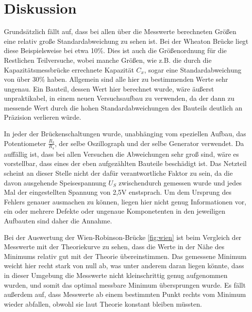\section{Diskussion}
\label{sec:Diskussion}

Grundsätzlich fällt auf, dass bei allen über die Messwerte berechneten Größen
eine relativ große Standardabweichung zu sehen ist. Bei der Wheaton Brücke liegt diese
Beispielsweise bei etwa 10\%. Dies ist auch die Größenordnung für die Restlichen Teilversuche,
wobei manche Größen, wie z.B. die durch die Kapazitätsmessbrücke errechnete Kapazität $C_x$,
sogar eine Standardabweichung von über 30\% haben. Allgemein sind alle hier zu bestimmenden
Werte sehr ungenau. Ein Bauteil, dessen Wert hier berechnet wurde, wäre äußerst unpraktikabel,
in einem neuen Versuchsaufbau zu verwenden, da der dann zu messende Wert durch die hohen Standardabweichungen
des Bauteils deutlich an Präzision verlieren würde. 

In jeder der Brückenschaltungen wurde, unabhänging vom speziellen Aufbau, das Potentiometer $\frac{R_3}{R_4}$,
der selbe Oszillograph und der selbe Generator verwendet. Da auffällig ist, dass bei allen Versuchen die Abweichungen
sehr groß sind, wäre es vorstellbar, dass eines der eben aufgezählten Bauteile beschädigt ist. Das Netzteil scheint an 
dieser Stelle nicht der dafür verantwortliche Faktor zu sein, da die davon ausgehende Speisespannung $U_S$ zwischendurch 
gemessen wurde und jedes Mal der eingestellten Spannung von 2,5\si{\volt} enstsprach. Um dem Ursprung des Fehlers genauer 
ausmachen zu können, liegen hier nicht genug Informationen vor, ein oder mehrere Defekte oder ungenaue Komponetenten in 
den jeweiligen Aufbauten sind daher die Annahme.

Bei der Auswertung der Wien-Robinson-Brücke \ref{fig:wien} ist beim Vergleich der Messwerte mit der Theoriekurve zu sehen,
dass die Werte in der Nähe des Minimums relativ gut mit der Theorie übereinstimmen. Das gemessene Minimum weicht hier recht stark
von null ab, was unter anderem daran liegen könnte, dass in dieser Umgebung die Messwerte nicht kleinschrittig genug aufgenommen 
wurden, und somit das optimal messbare Minimum übersprungen wurde.  Es fällt außerdem auf, dass Messwerte ab einem bestimmten 
Punkt rechts vom Minimum wieder abfallen, obwohl sie laut Theorie konstant bleiben müssten. 
